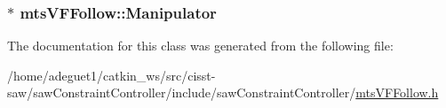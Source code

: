 \hypertarget{classmts_v_f_follow_ad30c27f37797a47a2461551aab20103a}{
\subsubsection[{Manipulator}]{$\ast$ mts\-V\-F\-Follow\-::\-Manipulator}}\label{classmts_v_f_follow_ad30c27f37797a47a2461551aab20103a}


The documentation for this class was generated from the following file\-:\begin{DoxyCompactItemize}
\item 
/home/adeguet1/catkin\-\_\-ws/src/cisst-\/saw/saw\-Constraint\-Controller/include/saw\-Constraint\-Controller/\hyperlink{saw_constraint_controller_2include_2saw_constraint_controller_2mts_v_f_follow_8h}{mts\-V\-F\-Follow.\-h}\end{DoxyCompactItemize}
